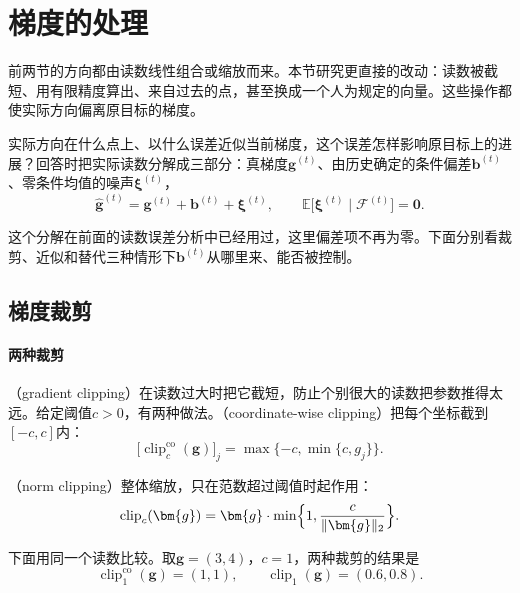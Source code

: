 \section{梯度的处理}
\label{sec:sgdb-processing}

前两节的方向都由读数线性组合或缩放而来。本节研究更直接的改动：读数被截短、用有限精度算出、来自过去的点，甚至换成一个人为规定的向量。这些操作都使实际方向偏离原目标的梯度。

实际方向在什么点上、以什么误差近似当前梯度，这个误差怎样影响原目标上的进展？回答时把实际读数分解成三部分：真梯度$\bm{g}^{(t)}$、由历史确定的条件偏差$\bm{b}^{(t)}$、零条件均值的噪声$\bm{\xi}^{(t)}$，
\begin{equation}
 \hat{\bm g}^{(t)}=\bm{g}^{(t)}+\bm{b}^{(t)}+\bm{\xi}^{(t)},\qquad
 \mathbb{E}\bigl[\bm{\xi}^{(t)}\mid\mathcal{F}^{(t)}\bigr]=\bm{0}.
 \label{eq:sgdb-reading-decomposition}
\end{equation}

这个分解在前面的读数误差分析中已经用过，这里偏差项不再为零。下面分别看裁剪、近似和替代三种情形下$\bm{b}^{(t)}$从哪里来、能否被控制。

\subsection{梯度裁剪}
\label{sec:sgdb-clipping}

\paragraph{两种裁剪}
（gradient clipping）在读数过大时把它截短，防止个别很大的读数把参数推得太远。给定阈值$c>0$，有两种做法。（coordinate-wise clipping）把每个坐标截到$[-c,c]$内：
\begin{equation}
 \bigl[\operatorname{clip}^{\mathrm{co}}_c(\bm{g})\bigr]_j=\max\{-c,\min\{c,g_j\}\}.
 \label{eq:sgdb-clip-coord}
\end{equation}

（norm clipping）整体缩放，只在范数超过阈值时起作用：
\begin{equation}
 \operatorname{clip}_c(\bm{g})=\bm{g}\cdot\min\Bigl\{1,\frac{c}{\lVert\bm{g}\rVert_2}\Bigr\}.
 \label{eq:sgdb-clip-norm}
\end{equation}

下面用同一个读数比较。取$\bm{g}=(3,4)$，$c=1$，两种裁剪的结果是
\[
 \operatorname{clip}^{\mathrm{co}}_1(\bm{g})=(1,1),\qquad
 \operatorname{clip}_1(\bm{g})=(0.6,0.8).
\]

